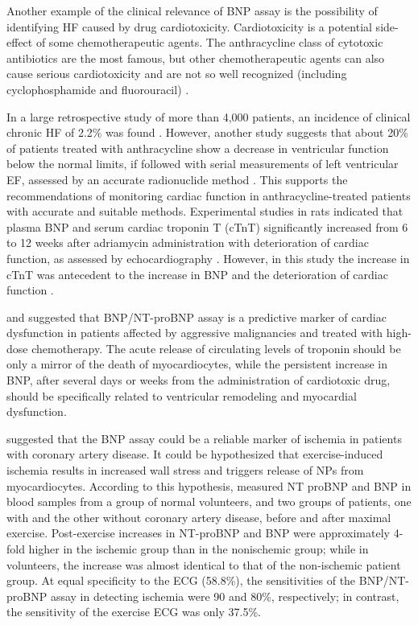 \documentclass[14pt,a4paper,onecolumn]{extarticle}
\begin{document}
Another example of the clinical relevance of BNP assay is the possibility of identifying HF caused by drug cardiotoxicity. Cardiotoxicity is a potential side-effect of some chemotherapeutic agents. The anthracycline class of cytotoxic antibiotics are the most famous, but other chemotherapeutic agents can also cause serious cardiotoxicity and are not so well recognized (including cyclophosphamide and fluorouracil) \citep{bib3154}.

In a large retrospective study of more than 4,000 patients, an incidence of clinical chronic HF of 2.2\% was found \citep{bib3155}. However, another  study suggests that about 20\% of patients treated with anthracycline show a decrease in ventricular function below the normal limits, if followed with serial measurements of left ventricular EF, assessed by an accurate radionuclide method \citep{bib3156}. This supports the recommendations of monitoring cardiac function in anthracycline-treated patients with accurate and suitable methods. Experimental studies in rats indicated that plasma BNP and serum cardiac troponin T (cTnT) significantly increased from 6 to 12 weeks after adriamycin administration with deterioration of cardiac function, as assessed by echocardiography \citep{bib3157}. However, in this study the increase in cTnT was antecedent to the increase in BNP and the deterioration of cardiac function \citep{bib3157}.

\citep{bib3161} and \citep{bib3162} suggested that BNP/NT-proBNP assay is a predictive marker of cardiac dysfunction in patients affected by aggressive malignancies and treated with high-dose chemotherapy. The acute release of circulating levels of troponin should be only a mirror of the death of myocardiocytes, while the persistent increase in BNP, after several days or weeks from the administration of cardiotoxic drug, should be specifically related to ventricular remodeling and myocardial dysfunction.

 \citep{bib3163} \citep{bib3164} suggested that the BNP assay could be a reliable marker of ischemia in patients with coronary artery disease. It could be hypothesized that exercise-induced ischemia results in increased wall stress and triggers release of NPs from myocardiocytes. According to this hypothesis, \citep{bib3163} measured NT proBNP and BNP in blood samples from a group of normal volunteers, and two groups of patients, one with and the other without coronary artery disease, before and after maximal exercise. Post-exercise increases in NT-proBNP and BNP were approximately 4-fold higher in the ischemic group than in the nonischemic group; while in volunteers, the increase was almost identical to that of the non-ischemic patient group. At equal specificity to the ECG (58.8\%), the sensitivities of the BNP/NT-proBNP assay in detecting ischemia were 90 and 80\%, respectively; in contrast, the sensitivity of the exercise ECG was only 37.5\%.
\end{document}
